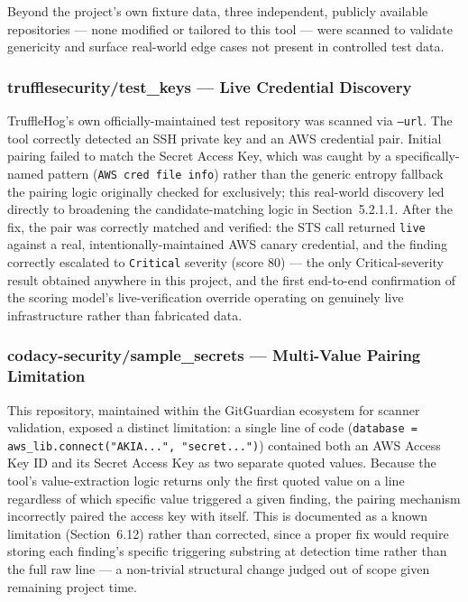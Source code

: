 \documentclass[12pt]{article}
\begin{document}
Beyond the project's own fixture data, three independent, publicly available repositories --- none modified or tailored to this tool --- were scanned to validate genericity and surface real-world edge cases not present in controlled test data.

\subsubsection{trufflesecurity/test\_keys --- Live Credential Discovery}

TruffleHog's own officially-maintained test repository was scanned via \texttt{--url}. The tool correctly detected an SSH private key and an AWS credential pair. Initial pairing failed to match the Secret Access Key, which was caught by a specifically-named pattern (\texttt{AWS cred file info}) rather than the generic entropy fallback the pairing logic originally checked for exclusively; this real-world discovery led directly to broadening the candidate-matching logic in Section~5.2.1.1. After the fix, the pair was correctly matched and verified: the STS call returned \texttt{live} against a real, intentionally-maintained AWS canary credential, and the finding correctly escalated to \texttt{Critical} severity (score 80) --- the only Critical-severity result obtained anywhere in this project, and the first end-to-end confirmation of the scoring model's live-verification override operating on genuinely live infrastructure rather than fabricated data.

\subsubsection{codacy-security/sample\_secrets --- Multi-Value Pairing Limitation}

This repository, maintained within the GitGuardian ecosystem for scanner validation, exposed a distinct limitation: a single line of code (\texttt{database = aws\_lib.connect("AKIA...", "secret...")}) contained both an AWS Access Key ID and its Secret Access Key as two separate quoted values. Because the tool's value-extraction logic returns only the first quoted value on a line regardless of which specific value triggered a given finding, the pairing mechanism incorrectly paired the access key with itself. This is documented as a known limitation (Section~6.12) rather than corrected, since a proper fix would require storing each finding's specific triggering substring at detection time rather than the full raw line --- a non-trivial structural change judged out of scope given remaining project time.
\end{document}
